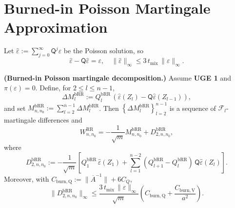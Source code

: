 
\section{Burned-in Poisson Martingale Approximation}

Let $\hat{\varepsilon} := \sum_{j = 0}^{\infty} \mathsf{Q}^{j} \varepsilon$ be the
Poisson solution, so
\[
\hat{\varepsilon} - \mathsf{Q} \hat{\varepsilon} = \varepsilon,
\quad
\lVert \hat{\varepsilon} \rVert_{\infty}
  \le 3 \, t_{\mathrm{mix}} \, \lVert \varepsilon \rVert_{\infty}.
\]

\begin{lemma}\label{lem:burn-poisson-decomp}
  \textbf{(Burned-in Poisson martingale decomposition.)}
  Assume \textbf{UGE 1} and $\pi(\varepsilon) = 0$. Define, for $2 \le l \le n - 1$,
  \[
\Delta M_{l}^{\mathrm{bRR}}
    := Q_{l}^{\mathrm{bRR}} \,
       \left( \hat{\varepsilon}(Z_{l}) - \mathsf{Q} \hat{\varepsilon}(Z_{l - 1}) \right) ,
\]
  and set $M_{n,n_{0}}^{\mathrm{bRR}} := \sum_{l = 2}^{n - 1} \Delta M_{l}^{\mathrm{bRR}}$.
  Then $\left\{ \Delta M_{l}^{\mathrm{bRR}} \right\}_{l = 2}^{n - 1}$ is a sequence of
  $\mathcal{F}_{l}$-martingale differences and
  \begin{equation}
W_{n,n_{0}}^{\mathrm{RR}}
    = -\frac{1}{\sqrt{m}} M_{n,n_{0}}^{\mathrm{bRR}}
      + D_{2,n,n_{0}}^{\mathrm{bRR}},
\label{eq:burn-poisson-decomp}
\end{equation}
  where
  \[
D_{2,n,n_{0}}^{\mathrm{bRR}}
    := -\frac{1}{\sqrt{m}} \left[ Q_{1}^{\mathrm{bRR}} \, \hat{\varepsilon}(Z_{1})
        + \sum_{l = 1}^{n - 2}
            \left( Q_{l + 1}^{\mathrm{bRR}} - Q_{l}^{\mathrm{bRR}} \right)
            \, \mathsf{Q} \hat{\varepsilon}(Z_{l}) \right].
\]
  Moreover, with $C_{\mathrm{burn,Q}} := \lVert \overline{A}^{-1} \rVert + 6 C_{Q}$,
  \begin{equation}
\lVert D_{2,n,n_{0}}^{\mathrm{bRR}} \rVert_{\infty}
    \le \frac{3 \, t_{\mathrm{mix}} \, \lVert \varepsilon \rVert_{\infty}}{\sqrt{m}}
       \left( C_{\mathrm{burn,Q}} + \frac{C_{\mathrm{burn,V}}}{a^{2}} \right).
\label{eq:burn-D2-bound}
\end{equation}
\end{lemma}


